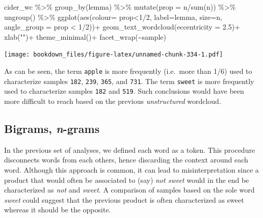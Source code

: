 \documentclass[
]{krantz}
\makeatletter
\newenvironment{Shaded}{\begin{snugshade}}{\end{snugshade}}
\newcommand{\AttributeTok}[1]{\textcolor[rgb]{0.61,0.61,0.61}{#1}}
\newcommand{\DecValTok}[1]{\textcolor[rgb]{0.06,0.06,0.06}{#1}}
\newcommand{\FloatTok}[1]{\textcolor[rgb]{0.06,0.06,0.06}{#1}}
\newcommand{\FunctionTok}[1]{\textcolor[rgb]{0,0,0}{#1}}
\newcommand{\NormalTok}[1]{#1}
\newcommand{\SpecialCharTok}[1]{\textcolor[rgb]{0,0,0}{#1}}
\newcommand{\StringTok}[1]{\textcolor[rgb]{0.5,0.5,0.5}{#1}}
\newenvironment{kframe}{%
\medskip{}
\setlength{\fboxsep}{.8em}
 \def\at@end@of@kframe{}%
 \ifinner\ifhmode%
  \def\at@end@of@kframe{\end{minipage}}%
  \begin{minipage}{\columnwidth}%
 \fi\fi%
 \def\FrameCommand##1{\hskip\@totalleftmargin \hskip-\fboxsep
 \colorbox{shadecolor}{##1}\hskip-\fboxsep
     \hskip-\linewidth \hskip-\@totalleftmargin \hskip\columnwidth}%
 \MakeFramed {\advance\hsize-\width
   \@totalleftmargin\z@ \linewidth\hsize
   \@setminipage}}%
 {\par\unskip\endMakeFramed%
 \at@end@of@kframe}
\renewenvironment{Shaded}{\begin{kframe}}{\end{kframe}}
\makeatother
\begin{document}
\begin{Shaded}
\begin{Highlighting}[]
\NormalTok{cider\_wc }\SpecialCharTok{\%\textgreater{}\%} 
  \FunctionTok{group\_by}\NormalTok{(lemma) }\SpecialCharTok{\%\textgreater{}\%} 
  \FunctionTok{mutate}\NormalTok{(}\AttributeTok{prop =}\NormalTok{ n}\SpecialCharTok{/}\FunctionTok{sum}\NormalTok{(n)) }\SpecialCharTok{\%\textgreater{}\%} 
  \FunctionTok{ungroup}\NormalTok{() }\SpecialCharTok{\%\textgreater{}\%} 
  \FunctionTok{ggplot}\NormalTok{(}\FunctionTok{aes}\NormalTok{(}\AttributeTok{colour=}\NormalTok{ prop}\SpecialCharTok{\textless{}}\DecValTok{1}\SpecialCharTok{/}\DecValTok{2}\NormalTok{, }\AttributeTok{label=}\NormalTok{lemma, }\AttributeTok{size=}\NormalTok{n, }
             \AttributeTok{angle\_group =}\NormalTok{ prop }\SpecialCharTok{\textless{}} \DecValTok{1}\SpecialCharTok{/}\DecValTok{2}\NormalTok{))}\SpecialCharTok{+}
  \FunctionTok{geom\_text\_wordcloud}\NormalTok{(}\AttributeTok{eccentricity =} \FloatTok{2.5}\NormalTok{)}\SpecialCharTok{+}
  \FunctionTok{xlab}\NormalTok{(}\StringTok{""}\NormalTok{)}\SpecialCharTok{+}
  \FunctionTok{theme\_minimal}\NormalTok{()}\SpecialCharTok{+}
  \FunctionTok{facet\_wrap}\NormalTok{(}\SpecialCharTok{\textasciitilde{}}\NormalTok{sample)}
\end{Highlighting}
\end{Shaded}

\texttt{[image: bookdown\_files/figure-latex/unnamed-chunk-334-1.pdf]}

As can be seen, the term \texttt{apple} is more frequently (i.e.~more than 1/6) used to characterize samples \texttt{182}, \texttt{239}, \texttt{365}, and \texttt{731}. The term \texttt{sweet} is more frequently used to characterize samples \texttt{182} and \texttt{519}. Such conclusions would have been more difficult to reach based on the previous \emph{unstructured} wordcloud.

\hypertarget{bigrams-n-grams}{%
\subsection{\texorpdfstring{Bigrams, \emph{n}-grams}{Bigrams, n-grams}}\label{bigrams-n-grams}}

In the previous set of analyses, we defined each word as a token. This procedure disconnects words from each others, hence discarding the context around each word. Although this approach is common, it can lead to misinterpretation since a product that would often be associated to (say) \emph{not sweet} would in the end be characterized as \emph{not} and \emph{sweet}. A comparison of samples based on the sole word \emph{sweet} could suggest that the previous product is often characterized as sweet whereas it should be the opposite.
\end{document}
